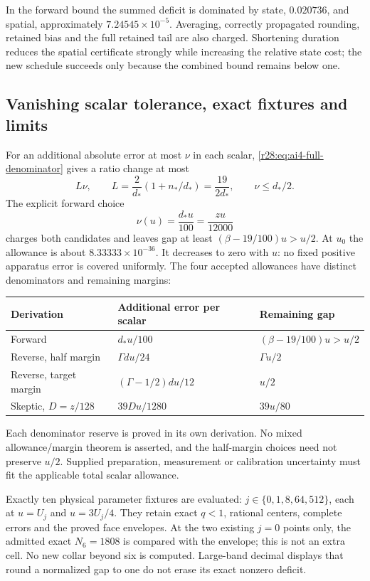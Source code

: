 In the forward bound the summed deficit is dominated by state, $0.020736$, and spatial, approximately $7.24545\times10^{-5}$. Averaging, correctly propagated rounding, retained bias and the full retained tail are also charged. Shortening duration reduces the spatial certificate strongly while increasing the relative state cost; the new schedule succeeds only because the combined bound remains below one.

\subsection{Vanishing scalar tolerance, exact fixtures and limits}
For an additional absolute error at most $\nu$ in each scalar, \eqref{r28:eq:ai4-full-denominator} gives a ratio change at most
\begin{equation}
 L\nu,\qquad L=\frac2{d_*}(1+n_*/d_*)=\frac{19}{2d_*},
 \qquad\nu\le d_*/2.
\end{equation}
The explicit forward choice
\begin{equation}
 \nu(u)=\frac{d_*u}{100}=\frac{zu}{12000}
 \label{r28:eq:ai4-scalar-tolerance}
\end{equation}
charges both candidates and leaves gap at least $(\beta-19/100)u>u/2$. At $u_0$ the allowance is about $8.33333\times10^{-36}$. It decreases to zero with $u$: no fixed positive apparatus error is covered uniformly. The four accepted allowances have distinct denominators and remaining margins:
\begin{center}\small
\begin{tabular}{@{}lll@{}}\toprule
Derivation & Additional error per scalar & Remaining gap\\\midrule
Forward & $d_*u/100$ & $(\beta-19/100)u>u/2$\\
Reverse, half margin & $\Gamma du/24$ & $\Gamma u/2$\\
Reverse, target margin & $(\Gamma-1/2)du/12$ & $u/2$\\
Skeptic, $D=z/128$ & $39Du/1280$ & $39u/80$\\\bottomrule
\end{tabular}
\end{center}
Each denominator reserve is proved in its own derivation. No mixed allowance/margin theorem is asserted, and the half-margin choices need not preserve $u/2$. Supplied preparation, measurement or calibration uncertainty must fit the applicable total scalar allowance.

Exactly ten physical parameter fixtures are evaluated: $j\in\{0,1,8,64,512\}$, each at $u=U_j$ and $u=3U_j/4$. They retain exact $q<1$, rational centers, complete errors and the proved face envelopes. At the two existing $j=0$ points only, the admitted exact $N_6=1808$ is compared with the envelope; this is not an extra cell. No new collar beyond six is computed. Large-band decimal displays that round a normalized gap to one do not erase its exact nonzero deficit.

